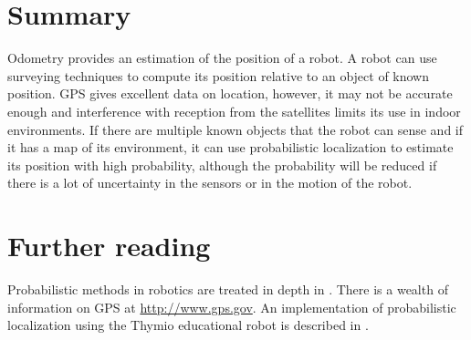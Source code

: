 \section{Summary}

Odometry provides an estimation of the position of a robot. A robot can use surveying techniques to compute its position relative to an object of known position. GPS gives excellent data on location, however, it may not be accurate enough and interference with reception from the satellites limits its use in indoor environments. If there are multiple known objects that the robot can sense and if it has a map of its environment, it can use probabilistic localization to estimate its position with high probability, although the probability will be reduced if there is a lot of uncertainty in the sensors or in the motion of the robot.

\section{Further reading}

Probabilistic methods in robotics are treated in depth in \cite{thrun}. There is a wealth of information on GPS at \url{http://www.gps.gov}. An implementation of probabilistic localization using the Thymio educational robot is described in \cite{wang2016dars}.




